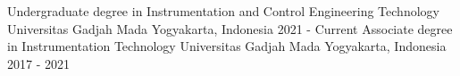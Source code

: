 

\begin{cventries}

  \cventry
    {Undergraduate degree in Instrumentation and Control Engineering Technology} %
    {Universitas Gadjah Mada} %
    {Yogyakarta, Indonesia} %
    {2021 - Current} %
    {}
  \cventry
    {Associate degree in Instrumentation Technology} %
    {Universitas Gadjah Mada} %
    {Yogyakarta, Indonesia} %
    {2017 - 2021} %
    {}
\end{cventries}
